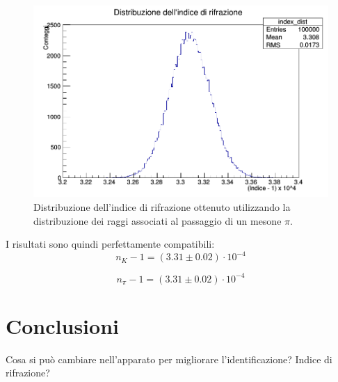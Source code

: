 \documentclass[8pt]{extarticle}
\begin{document}
\begin{figure}
\begin{center}
\includegraphics[scale=0.4]{indicePI_definitivo}
\caption{Distribuzione dell'indice di rifrazione ottenuto utilizzando la distribuzione dei raggi associati al passaggio di un mesone $\pi$.}
\label{fig:indicePI}
\end{center}
\end{figure}

I risultati sono quindi perfettamente compatibili: \\
\begin{equation}
n_K -1 = (3.31 \pm 0.02) \cdot 10^{-4}
\nonumber
\end{equation}

\begin{equation}
n_{\pi} -1 = (3.31 \pm 0.02) \cdot 10^{-4}
\nonumber
\end{equation}

\section{Conclusioni}
Cosa si può cambiare nell'apparato per migliorare l'identificazione? Indice di rifrazione?

%
\end{document}
